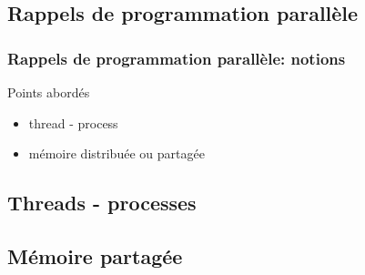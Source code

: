 \documentclass{beamer}
\begin{document}
\begin{frame}
\section{Rappels de programmation parallèle}
\frametitle{Rappels de programmation parallèle: notions}
Points abord\'es
\begin{itemize}
\item thread - process
\item m\'emoire distribu\'ee ou partag\'ee
\end{itemize}
\end{frame}

\begin{frame}
	\subsection{Threads - processes}
\end{frame}

\begin{frame}
	\subsection{M\'emoire partag\'ee}
\end{frame}
\end{document}
